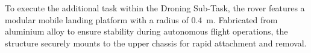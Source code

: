 %
%

To execute the additional task within the Droning Sub-Task, the rover
features a modular mobile landing platform with a radius of
\qty{0.4}{\meter}. Fabricated from aluminium alloy to ensure stability
during autonomous flight operations, the structure securely mounts to the
upper chassis for rapid attachment and removal.

